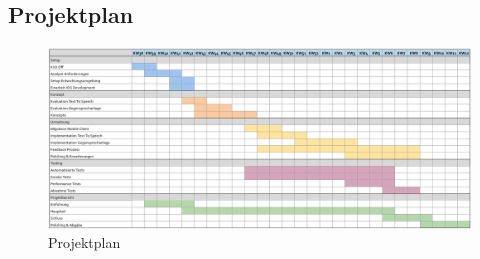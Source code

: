 \subsection{Projektplan}

\begin{figure}[h]
    \centering
    \begin{minipage}[b]{\textwidth}
        \includegraphics[width=\textwidth]{graphics/projektplan}
        \caption{Projektplan}
    \end{minipage}\label{fig:projektplan}
\end{figure}


